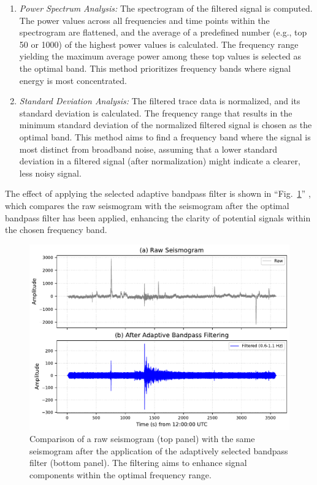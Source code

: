 \documentclass[conference]{IEEEtran}
\begin{document}
            \begin{enumerate}[label=\alph*), leftmargin=3em]
                \item \textit{Power Spectrum Analysis:} The spectrogram of the filtered signal is computed.
                The power values across all frequencies and time points within the spectrogram are flattened, and the average of
                a predefined number (e.g., top 50 or 1000) of the highest power values is calculated. The frequency range
                yielding the maximum average power among these top values is selected as the optimal band. This method
                prioritizes frequency bands where signal energy is most concentrated.
                \item \textit{Standard Deviation Analysis:} The filtered trace data is normalized, and its
                standard deviation is calculated. The frequency range that results in the minimum standard deviation of the
                normalized filtered signal is chosen as the optimal band. This method aims to find a frequency band where the
                signal is most distinct from broadband noise, assuming that a lower standard deviation in a filtered signal
                (after normalization) might indicate a clearer, less noisy signal.
            \end{enumerate}

            The effect of applying the selected adaptive bandpass filter is shown in ``Fig.~\ref{fig:adaptive_filtering_comparison}''
            , which compares the raw seismogram with the seismogram after the optimal bandpass filter has been applied, 
            enhancing the clarity of potential signals within the chosen frequency band.
            \begin{figure}[htbp]
                \centerline{\includegraphics[width=0.9\columnwidth]{figures/fig2_adaptive_bandpass.pdf}}
                \caption{Comparison of a raw seismogram (top panel) with the same seismogram after the application 
                of the adaptively selected bandpass filter (bottom panel). The filtering aims to enhance signal 
                components within the optimal frequency range.}
                \label{fig:adaptive_filtering_comparison} 
            \end{figure}
\end{document}
